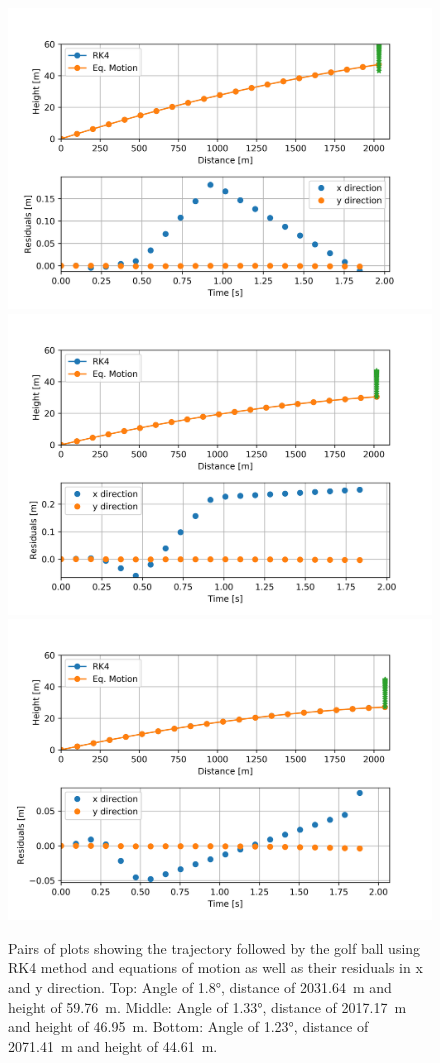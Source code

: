 \begin{figure}[ht]
    \centering
    \includegraphics[width=.5\textwidth]{figures/a1-8x2031-6375y59-75881.png}
    \includegraphics[width=.5\textwidth]{figures/a1-334x2017-1671y46-94758.png}
    \includegraphics[width=.5\textwidth]{figures/a1-23x2071-4148y44-610104.png}
    \caption{Pairs of plots showing the trajectory followed by the golf ball using RK4 method and equations of motion as well as their residuals in x and y direction. 
    Top: Angle of \ang{1.8}, distance of \SI{2031.64}{\m} and height of \SI{59.76}{\m}. Middle: Angle of \ang{1.33}, distance of \SI{2017.17}{\m} and height of \SI{46.95}{\m}. Bottom: Angle of \ang{1.23}, distance of \SI{2071.41}{\m} and height of \SI{44.61}{\m}.}
    \label{fig:diffAngles}
\end{figure}{}

